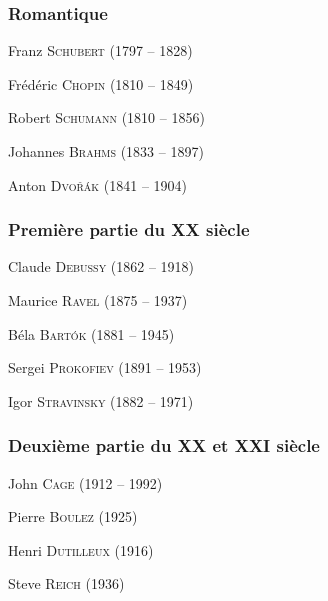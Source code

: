 \documentclass[11pt,a4paper]{scrreprt}
\begin{document}
\subsubsection{Romantique}
\begin{description}
\item Franz \textsc{Schubert} (1797 -- 1828)
\item Frédéric \textsc{Chopin} (1810 -- 1849)
\item Robert \textsc{Schumann} (1810 -- 1856)
\item Johannes \textsc{Brahms} (1833 -- 1897)
\item Anton \textsc{Dvo\v{r}ák} (1841 -- 1904)
\end{description}

\subsubsection{Première partie du XX\ieme{} siècle}
\begin{description}
\item Claude \textsc{Debussy} (1862 -- 1918)
\item Maurice \textsc{Ravel} (1875 -- 1937)
\item Béla \textsc{Bartók} (1881 -- 1945)
\item Sergei \textsc{Prokofiev} (1891 -- 1953)
\item Igor \textsc{Stravinsky} (1882 -- 1971)
\end{description}

\subsubsection{Deuxième partie du XX\ieme{} et XXI\ieme{} siècle}
\begin{description}
\item John \textsc{Cage} (1912 -- 1992)
\item Pierre \textsc{Boulez} (1925)
\item Henri \textsc{Dutilleux} (1916)
\item Steve \textsc{Reich} (1936)
\end{description}


\printindex
\end{document}
